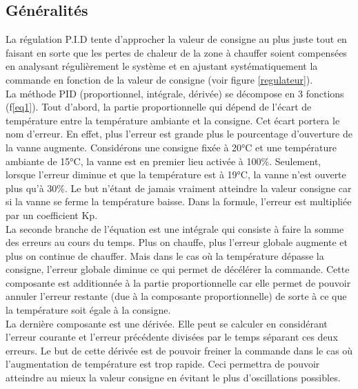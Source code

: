 \documentclass[12pt]{report}
\begin{document}
\subsection{Généralités}
La régulation P.I.D tente d'approcher la valeur de consigne au plus juste tout en faisant en sorte que les pertes de chaleur de la zone à chauffer soient compens\'{e}es en analysant régulièrement le système et en ajustant systématiquement la commande en fonction de la valeur de consigne (voir figure \ref{regulateur}).\\
\noindent
La m\'{e}thode PID (proportionnel, int\'egrale, d\'eriv\'ee) se d\'{e}compose en 3 fonctions (f\ref{eq1}). Tout d'abord, la partie proportionnelle qui d\'{e}pend de l'\'{e}cart de temp\'{e}rature entre la température ambiante et la consigne. Cet \'{e}cart portera le nom d'erreur. En effet, plus l'erreur est grande plus le pourcentage d'ouverture de la vanne augmente. Consid\'{e}rons une consigne fix\'{e}e \`{a} 20°C et une temp\'{e}rature ambiante de 15°C, la vanne est en premier lieu activ\'{e}e \`{a} 100\%. Seulement, lorsque l'erreur diminue et que la temp\'{e}rature est \`{a} 19°C, la vanne n'est ouverte plus qu'\`{a} 30\%. Le but n'étant de jamais vraiment atteindre la valeur consigne car si la vanne se ferme la température baisse. Dans la formule, l'erreur est multipli\'{e}e par un coefficient Kp.\\ %

\noindent
La seconde branche de l'\'{e}quation est une int\'{e}grale qui consiste \`{a} faire la somme des erreurs au cours du temps. Plus on chauffe, plus l'erreur globale augmente et plus on continue de chauffer. Mais dans le cas o\`{u} la temp\'{e}rature d\'{e}passe la consigne, l'erreur globale diminue ce qui permet de d\'{e}c\'{e}l\'{e}rer la commande. Cette composante est additionn\'{e}e à la partie proportionnelle car elle permet de pouvoir annuler l'erreur restante (due \`{a} la composante proportionnelle) de sorte \`{a} ce que la temp\'{e}rature soit \'{e}gale \`{a} la consigne.\\

\noindent
La derni\`{e}re composante est une d\'{e}riv\'{e}e. Elle peut se calculer en consid\'{e}rant l'erreur courante et l'erreur pr\'{e}c\'{e}dente divis\'{e}es par le temps s\'{e}parant ces deux erreurs. Le but de cette d\'{e}riv\'{e}e est de pouvoir freiner la commande dans le cas o\`{u} l'augmentation de temp\'{e}rature est trop rapide. Ceci permettra de pouvoir atteindre au mieux la valeur consigne en \'{e}vitant le plus d'oscillations possibles.\\
\end{document}

